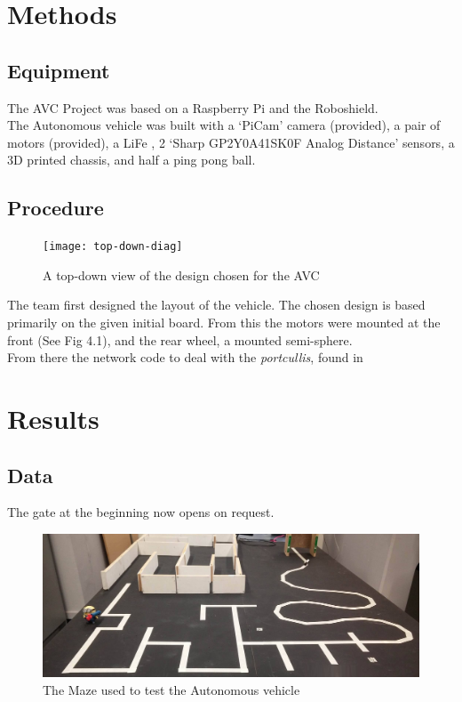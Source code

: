 \documentclass[paper=a4, fontsize=11pt]{scrartcl} %
\numberwithin{equation}{section} %
\numberwithin{figure}{section} %
\begin{document}
\section{Methods}
\subsection{Equipment}
The AVC Project was based on a Raspberry Pi and the Roboshield.\\
The Autonomous vehicle was built with a `PiCam' camera (provided), a pair of
motors (provided), a LiFe , 2 `Sharp GP2Y0A41SK0F Analog Distance' sensors, a 3D printed
chassis, and half a ping pong ball.
\subsection{Procedure}
\begin{figure}
  \begin{center}
    \texttt{[image: top-down-diag]}
    \caption{A top-down view of the design chosen for the AVC}
  \end{center}
\end{figure}
The team first designed the layout of the vehicle. The chosen design is based
primarily on the given initial board. From this the motors were mounted at the
front (See Fig 4.1), and the rear wheel, a mounted semi-sphere.\\
From there the network code to deal with the \textit{portcullis}, found in 

\section{Results}
\subsection{Data}
The gate at the beginning now opens on request.
\begin{figure}[h]
  \includegraphics[width=\textwidth]{maze}
  \centering
  \caption{The Maze used to test the Autonomous vehicle}
\end{figure}
\end{document}
